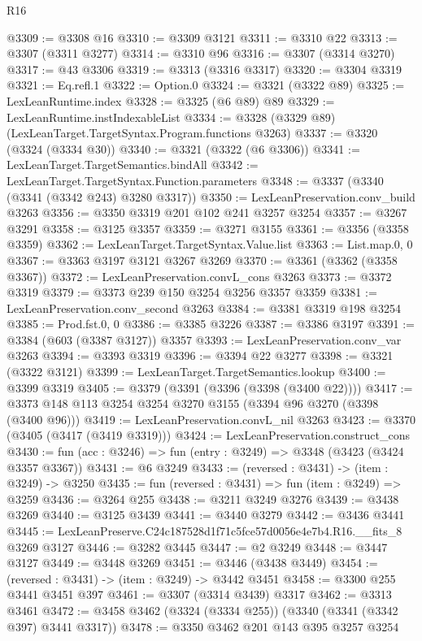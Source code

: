 \begin{lexlean}{R16}
\begin{coremodule}
@3309 := @3308 @16
@3310 := @3309 @3121
@3311 := @3310 @22
@3313 := @3307 (@3311 @3277)
@3314 := @3310 @96
@3316 := @3307 (@3314 @3270)
@3317 := @43 @3306
@3319 := @3313 (@3316 @3317)
@3320 := @3304 @3319
@3321 := Eq.refl.{1}
@3322 := Option.{0}
@3324 := @3321 (@3322 @89)
@3325 := LexLeanRuntime.index
@3328 := @3325 (@6 @89) @89
@3329 := LexLeanRuntime.instIndexableList
@3334 := @3328 (@3329 @89) (LexLeanTarget.TargetSyntax.Program.functions @3263)
@3337 := @3320 (@3324 (@3334 @30))
@3340 := @3321 (@3322 (@6 @3306))
@3341 := LexLeanTarget.TargetSemantics.bindAll
@3342 := LexLeanTarget.TargetSyntax.Function.parameters
@3348 := @3337 (@3340 (@3341 (@3342 @243) @3280 @3317))
@3350 := LexLeanPreservation.conv_build @3263
@3356 := @3350 @3319 @201 @102 @241 @3257 @3254
@3357 := @3267 @3291
@3358 := @3125 @3357
@3359 := @3271 @3155
@3361 := @3356 (@3358 @3359)
@3362 := LexLeanTarget.TargetSyntax.Value.list
@3363 := List.map.{0, 0}
@3367 := @3363 @3197 @3121 @3267 @3269
@3370 := @3361 (@3362 (@3358 @3367))
@3372 := LexLeanPreservation.convL_cons @3263
@3373 := @3372 @3319
@3379 := @3373 @239 @150 @3254 @3256 @3357 @3359
@3381 := LexLeanPreservation.conv_second @3263
@3384 := @3381 @3319 @198 @3254
@3385 := Prod.fst.{0, 0}
@3386 := @3385 @3226
@3387 := @3386 @3197
@3391 := @3384 (@603 (@3387 @3127)) @3357
@3393 := LexLeanPreservation.conv_var @3263
@3394 := @3393 @3319
@3396 := @3394 @22 @3277
@3398 := @3321 (@3322 @3121)
@3399 := LexLeanTarget.TargetSemantics.lookup
@3400 := @3399 @3319
@3405 := @3379 (@3391 (@3396 (@3398 (@3400 @22))))
@3417 := @3373 @148 @113 @3254 @3254 @3270 @3155 (@3394 @96 @3270 (@3398 (@3400 @96)))
@3419 := LexLeanPreservation.convL_nil @3263
@3423 := @3370 (@3405 (@3417 (@3419 @3319)))
@3424 := LexLeanPreservation.construct_cons
@3430 := fun (acc : @3246) => fun (entry : @3249) => @3348 (@3423 (@3424 @3357 @3367))
@3431 := @6 @3249
@3433 := (reversed : @3431) -> (item : @3249) -> @3250
@3435 := fun (reversed : @3431) => fun (item : @3249) => @3259
@3436 := @3264 @255
@3438 := @3211 @3249 @3276
@3439 := @3438 @3269
@3440 := @3125 @3439
@3441 := @3440 @3279
@3442 := @3436 @3441
@3445 := LexLeanPreserve.C24c187528d1f71c5fce57d0056e4e7b4.R16.__fits_8 @3269 @3127
@3446 := @3282 @3445
@3447 := @2 @3249
@3448 := @3447 @3127
@3449 := @3448 @3269
@3451 := @3446 (@3438 @3449)
@3454 := (reversed : @3431) -> (item : @3249) -> @3442 @3451
@3458 := @3300 @255 @3441 @3451 @397
@3461 := @3307 (@3314 @3439) @3317
@3462 := @3313 @3461
@3472 := @3458 @3462 (@3324 (@3334 @255)) (@3340 (@3341 (@3342 @397) @3441 @3317))
@3478 := @3350 @3462 @201 @143 @395 @3257 @3254

\end{coremodule}
\end{lexlean}
